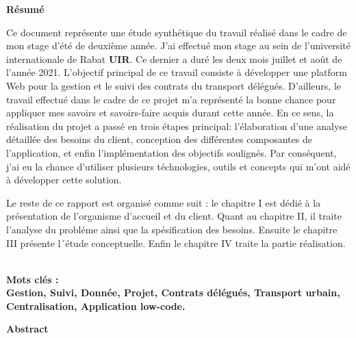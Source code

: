 \documentclass[a4paper]{report}
\begin{document}
\clearpage
{}
\begin{doublespace}
    \begin{center}
        \vspace*{1cm}

        \textbf{\huge{Résumé}}

    \end{center}
\end{doublespace}
\begin{doublespace}

    Ce document représente une étude synthétique du travail réalisé dans le cadre de mon stage d'été de deuxième année. J'ai effectué mon stage au sein de
    l'université internationale de Rabat \textbf{UIR}. Ce dernier a duré les deux mois juillet et août de l'année 2021. L’objectif principal de ce travail
    consiste à développer une platform Web pour la gestion et le suivi des contrats du transport délégués. D'ailleurs, le travail effectué dans le cadre
    de ce projet m'a représenté la bonne chance pour appliquer mes savoirs et savoirs-faire acquis durant cette année. En ce sens, la réalisation du projet
    a passé en trois étapes principal: l'élaboration d'une analyse détaillée des besoins du client, conception des différentes composantes de l'application,
    et enfin l'implémentation des objectifs soulignés. Par conséquent, j'ai eu la chance d'utiliser plusieurs téchnologies, outils et concepts
    qui m'ont aidé à développer cette solution.

\end{doublespace}
\begin{doublespace}

    Le reste de ce rapport est organisé comme suit : le chapitre I est dédié à la présentation de
    l’organisme d’accueil et du client. Quant au chapitre II, il traite l’analyse du probléme ainsi que
    la spésification des besoins. Ensuite le chapitre III présente l´étude conceptuelle. Enfin le chapitre
    IV traite la partie réalisation.

    \textbf	{\\Mots clés :\\ Gestion, Suivi, Donnée, Projet, Contrats délégués, Transport urbain, Centralisation, Application low-code.}

\end{doublespace}
\clearpage
{}
\begin{doublespace}
    \begin{center}
        \vspace*{1cm}
        \textbf{\huge{Abstract}}
    \end{center}
\end{doublespace}
\end{document}
